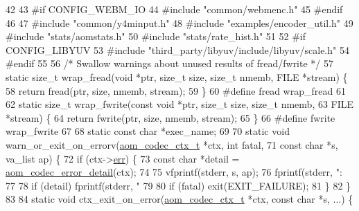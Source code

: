 \begin{DoxyCodeInclude}
42 
43 \textcolor{preprocessor}{#if CONFIG\_WEBM\_IO}
44 \textcolor{preprocessor}{#include "common/webmenc.h"}
45 \textcolor{preprocessor}{#endif}
46 
47 \textcolor{preprocessor}{#include "common/y4minput.h"}
48 \textcolor{preprocessor}{#include "examples/encoder\_util.h"}
49 \textcolor{preprocessor}{#include "stats/aomstats.h"}
50 \textcolor{preprocessor}{#include "stats/rate\_hist.h"}
51 
52 \textcolor{preprocessor}{#if CONFIG\_LIBYUV}
53 \textcolor{preprocessor}{#include "third\_party/libyuv/include/libyuv/scale.h"}
54 \textcolor{preprocessor}{#endif}
55 
56 \textcolor{comment}{/* Swallow warnings about unused results of fread/fwrite */}
57 \textcolor{keyword}{static} \textcolor{keywordtype}{size\_t} wrap\_fread(\textcolor{keywordtype}{void} *ptr, \textcolor{keywordtype}{size\_t} size, \textcolor{keywordtype}{size\_t} nmemb, FILE *stream) \{
58   \textcolor{keywordflow}{return} fread(ptr, size, nmemb, stream);
59 \}
60 \textcolor{preprocessor}{#define fread wrap\_fread}
61 
62 \textcolor{keyword}{static} \textcolor{keywordtype}{size\_t} wrap\_fwrite(\textcolor{keyword}{const} \textcolor{keywordtype}{void} *ptr, \textcolor{keywordtype}{size\_t} size, \textcolor{keywordtype}{size\_t} nmemb,
63     FILE *stream) \{
64   \textcolor{keywordflow}{return} fwrite(ptr, size, nmemb, stream);
65 \}
66 \textcolor{preprocessor}{#define fwrite wrap\_fwrite}
67 
68 \textcolor{keyword}{static} \textcolor{keyword}{const} \textcolor{keywordtype}{char} *exec\_name;
69 
70 \textcolor{keyword}{static} \textcolor{keywordtype}{void} warn\_or\_exit\_on\_errorv(\hyperlink{structaom__codec__ctx}{aom\_codec\_ctx\_t} *ctx, \textcolor{keywordtype}{int} fatal,
71     \textcolor{keyword}{const} \textcolor{keywordtype}{char} *s, va\_list ap) \{
72   \textcolor{keywordflow}{if} (ctx->\hyperlink{structaom__codec__ctx_a4cf9c265a7c34e92bb02d04aa3cab718}{err}) \{
73     \textcolor{keyword}{const} \textcolor{keywordtype}{char} *detail = \hyperlink{group__codec_ga43a70562598b485685794a4e9d9d53f7}{aom\_codec\_error\_detail}(ctx);
74 
75     vfprintf(stderr, s, ap);
76     fprintf(stderr, \textcolor{stringliteral}{": %
77 
78     \textcolor{keywordflow}{if} (detail) fprintf(stderr, \textcolor{stringliteral}{"    %
79 
80     \textcolor{keywordflow}{if} (fatal) exit(EXIT\_FAILURE);
81   \}
82 \}
83 
84 \textcolor{keyword}{static} \textcolor{keywordtype}{void} ctx\_exit\_on\_error(\hyperlink{structaom__codec__ctx}{aom\_codec\_ctx\_t} *ctx, \textcolor{keyword}{const} \textcolor{keywordtype}{char} *s, ...) \{
}}
\end{DoxyCodeInclude}

